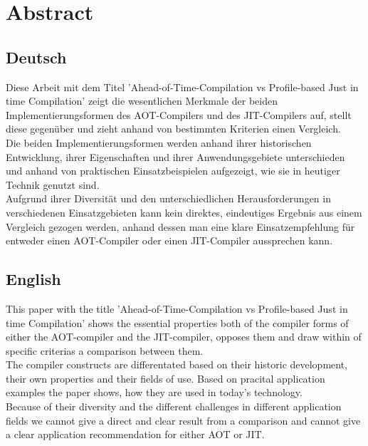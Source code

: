 \chapter{Abstract}

\section{Deutsch}
Diese Arbeit mit dem Titel 'Ahead-of-Time-Compilation vs Profile-based Just in time Compilation' zeigt die wesentlichen Merkmale der beiden Implementierungsformen des \ac{AOT}-Compilers und des \ac{JIT}-Compilers auf, stellt diese gegenüber und zieht anhand von bestimmten Kriterien einen Vergleich.\\
Die beiden Implementierungsformen werden anhand ihrer historischen Entwicklung, ihrer Eigenschaften und ihrer Anwendungsgebiete unterschieden und anhand von praktischen Einsatzbeispielen aufgezeigt, wie sie in heutiger Technik genutzt sind. \\
Aufgrund ihrer Diversität und den unterschiedlichen Herausforderungen in verschiedenen Einsatzgebieten kann kein direktes, eindeutiges Ergebnis aus einem Vergleich gezogen werden, anhand dessen man eine klare Einsatzempfehlung für entweder einen \ac{AOT}-Compiler oder einen \ac{JIT}-Compiler aussprechen kann.


\section{English}
This paper with the title 'Ahead-of-Time-Compilation vs Profile-based Just in time Compilation' shows the essential properties both of the compiler forms of either the \ac{AOT}-compiler and the \ac{JIT}-compiler, opposes them and draw within of specific criterias a comparison between them.\\
The compiler constructs are differentated based on their historic development, their own properties and their fields of use. Based on pracital application examples the paper shows, how they are used in today's technology.\\
Because of their diversity and the different challenges in different application fields we cannot give a direct and clear result from a comparison and cannot give a clear application recommendation for either \ac{AOT} or \ac{JIT}.